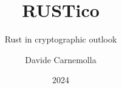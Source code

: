 \documentclass{beamer}
\title{RUSTico}
\subtitle{Rust in cryptographic outlook}
\author{Davide Carnemolla}
\institute{Università degli Studi di Catania}
\date{2024}
\begin{document}
    \begin{frame}
        \maketitle
    \end{frame}

    
    
\end{document}
